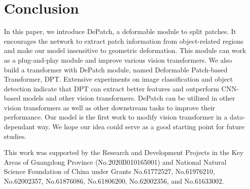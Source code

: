 \documentclass[sigconf,screen]{acmart}
\begin{document}
\section{Conclusion}
In this paper, we introduce DePatch, a deformable module to split patches. It encourages the network to extract patch information from object-related regions and make our model insensitive to geometric deformation. This module can work as a plug-and-play module and improve various vision transformers. We also build a transformer with DePatch module, named Deformable Patch-based Transformer, DPT. Extensive experiments on image classification and object detection indicate that DPT can extract better features and outperform CNN-based models and other vision transformers. DePatch can be utilized in other vision transformers as well as other downstream tasks to improve their performance. Our model is the first work to modify vision transformer in a data-dependant way. We hope our idea could serve as a good starting point for future studies.

\begin{acks}
This work was supported by the Research and Development Projects in the Key Areas of Guangdong Province (No.2020B010165001) and National Natural Science Foundation of China under Grants No.61772527, No.61976210, No.62002357, No.61876086, No.61806200, No.62002356, and No.61633002.
\end{acks}



\end{document}
